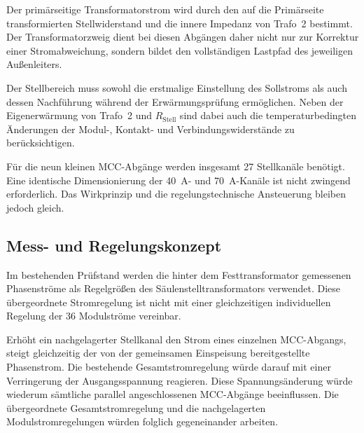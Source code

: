 Der primärseitige Transformatorstrom wird durch den auf die
Primärseite transformierten Stellwiderstand und die innere Impedanz
von Trafo~2 bestimmt. Der Transformatorzweig dient bei diesen
Abgängen daher nicht nur zur Korrektur einer Stromabweichung, sondern
bildet den vollständigen Lastpfad des jeweiligen Außenleiters.

Der Stellbereich muss sowohl die erstmalige Einstellung des
Sollstroms als auch dessen Nachführung während der Erwärmungsprüfung
ermöglichen. Neben der Eigenerwärmung von Trafo~2 und
\(R_{\mathrm{Stell}}\) sind dabei auch die temperaturbedingten
Änderungen der Modul-, Kontakt- und Verbindungswiderstände zu
berücksichtigen.

Für die neun kleinen MCC-Abgänge werden insgesamt 27 Stellkanäle
benötigt. Eine identische Dimensionierung der
\SI{40}{\ampere}- und \SI{70}{\ampere}-Kanäle ist nicht zwingend
erforderlich. Das Wirkprinzip und die regelungstechnische Ansteuerung
bleiben jedoch gleich.

\begin{center}
\end{center}



\subsection{Mess- und Regelungskonzept}
\label{sec:mess_regelungskonzept}

Im bestehenden Prüfstand werden die hinter dem Festtransformator
gemessenen Phasenströme als Regelgrößen des Säulenstelltransformators
verwendet. Diese übergeordnete Stromregelung ist nicht mit einer
gleichzeitigen individuellen Regelung der 36 Modulströme vereinbar.

Erhöht ein nachgelagerter Stellkanal den Strom eines einzelnen
MCC-Abgangs, steigt gleichzeitig der von der gemeinsamen Einspeisung
bereitgestellte Phasenstrom. Die bestehende Gesamtstromregelung würde
darauf mit einer Verringerung der Ausgangsspannung reagieren. Diese
Spannungsänderung würde wiederum sämtliche parallel angeschlossenen
MCC-Abgänge beeinflussen. Die übergeordnete Gesamtstromregelung und
die nachgelagerten Modulstromregelungen würden folglich gegeneinander
arbeiten.

